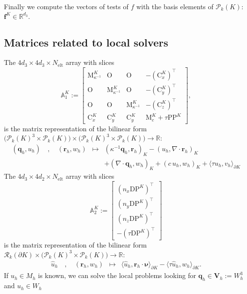 \documentclass[10pt,english]{article}
\newcommand{\Nelt}{{N_{\mathrm{elt}}}}
\begin{document}
Finally we compute the vectors of tests of $f$ with the basis elements of $\mathcal P_k(K)$: $\mathbf f^K \in \mathbb R^{d_3}$.

\subsection{Matrices related to local solvers}

The $4d_3\times 4d_3\times \Nelt$ array with slices
\[
\mathbb A_1^K:=\left[\begin{array}{cccc} \mathrm M_{\kappa^{-1}}^K & \mathrm O &\mathrm O & -(\mathrm C_x^K)^\top \\ 
 \mathrm O & \mathrm M_{\kappa^{-1}}^K & \mathrm O & -(\mathrm C_y^K)^\top\\
\mathrm O & \mathrm O & \mathrm M_{\kappa^{-1}}^K & -(\mathrm C_z^K)^\top\\
\mathrm C_x^K & \mathrm C_y^K & \mathrm C_y^K & \mathrm M_c^K+\tau\mathrm{PP}^K
\end{array}\right],
\]
is the matrix representation of the bilinear form $\Big(\mathcal P_k(K)^3\times \mathcal P_k(K)\Big)\times \Big(\mathcal P_k(K)^3\times \mathcal P_k(K)\Big) \to \mathbb R$:
\begin{eqnarray*}
(\boldsymbol q_h,u_h) \quad,\quad (\boldsymbol r_h,w_h)&\longmapsto & (\kappa^{-1}\boldsymbol q_h,\boldsymbol r_h)_K -(u_h,\nabla\cdot\boldsymbol r_h)_K \\
& & + (\nabla\cdot\boldsymbol q_h,w_h)_K+(c\,u_h,w_h)_K+\langle \tau u_h,v_h\rangle_{\partial K}
\end{eqnarray*}
The $4d_3\times 4d_2\times \Nelt$ array with slices
\[
 \mathbb A_2^K:=\left[\begin{array}{c} (n_x\mathrm{DP}^K)^\top\\ (n_y\mathrm{DP}^K)^\top \\
(n_z\mathrm{DP}^K)^\top \\
-(\tau\mathrm{DP}^K)^\top\end{array}\right]
\]
is the matrix representation of the bilinear form $ \mathcal R_k(\partial K)\times \Big(\mathcal P_k(K)^3\times \mathcal P_k(K)\Big)  \to \mathbb R$:
\begin{eqnarray*}
\widehat u_h \quad,\quad (\boldsymbol r_h,w_h)&\longmapsto & \langle \widehat u_h,\boldsymbol r_h \cdot\boldsymbol\nu\rangle_{\partial K} -\langle \tau \widehat u_h,w_h\rangle_{\partial K}.
\end{eqnarray*}
If $\widehat u_h \in M_h$ is known, we can solve the local problems looking for $\boldsymbol q_h \in \boldsymbol V_h:= W_h^3$ and $u_h \in W_h$
\end{document}

